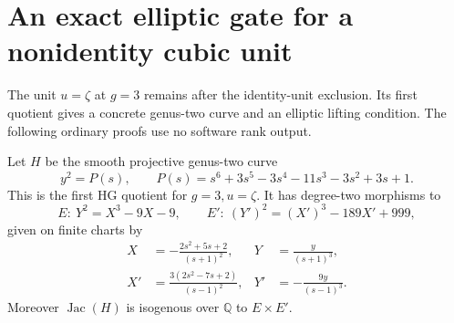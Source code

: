 \section{An exact elliptic gate for a nonidentity cubic unit}
\label{eqg-section}

The unit \(u=\zeta\) at \(g=3\) remains after the identity-unit
exclusion. Its first quotient gives a concrete genus-two curve
and an elliptic lifting condition. The following ordinary
proofs use no software rank output.

\begin{theorem}\label{eqg-quotients}
Let \(H\) be the smooth projective genus-two curve
\begin{equation}\label{eqg-sextic}
 y^2=P(s),\qquad
 P(s)=s^6+3s^5-3s^4-11s^3-3s^2+3s+1.
\end{equation}
This is the first HG quotient for \(g=3,u=\zeta\).
It has degree-two morphisms to
\begin{equation}\label{eqg-elliptic-curves}
 E:\ Y^2=X^3-9X-9,\qquad
 E':\ (Y')^2=(X')^3-189X'+999,
\end{equation}
given on finite charts by
\begin{align}
 X&=-\frac{2s^2+5s+2}{(s+1)^2},
 &Y&=\frac{y}{(s+1)^3},\label{eqg-first-map}\\
 X'&=\frac{3(2s^2-7s+2)}{(s-1)^2},
 &Y'&=-\frac{9y}{(s-1)^3}.\label{eqg-second-map}
\end{align}
Moreover \(\operatorname{Jac}(H)\) is isogenous over
\(\mathbb Q\) to \(E\times E'\).
\end{theorem}
